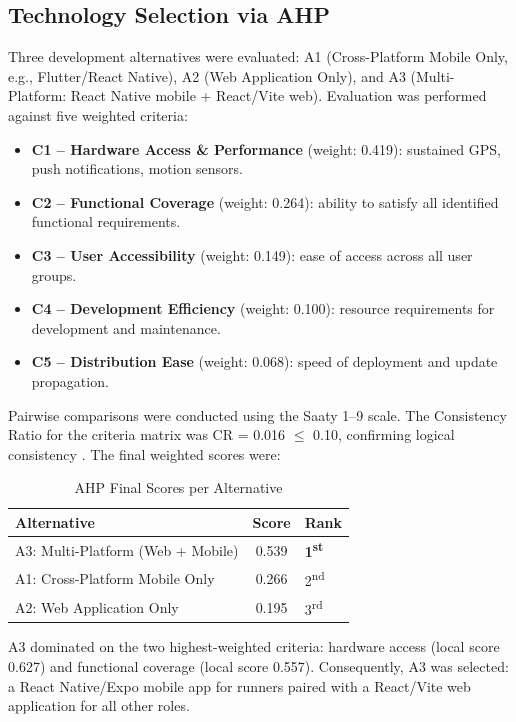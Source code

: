 \documentclass[conference]{IEEEtran}
\begin{document}
\subsection{Technology Selection via AHP}
Three development alternatives were evaluated: A1 (Cross-Platform Mobile Only, e.g., Flutter/React Native), A2 (Web Application Only), and A3 (Multi-Platform: React Native mobile + React/Vite web). Evaluation was performed against five weighted criteria:

\begin{itemize}
    \item \textbf{C1 -- Hardware Access \& Performance} (weight: 0.419): sustained GPS, push notifications, motion sensors.
    \item \textbf{C2 -- Functional Coverage} (weight: 0.264): ability to satisfy all identified functional requirements.
    \item \textbf{C3 -- User Accessibility} (weight: 0.149): ease of access across all user groups.
    \item \textbf{C4 -- Development Efficiency} (weight: 0.100): resource requirements for development and maintenance.
    \item \textbf{C5 -- Distribution Ease} (weight: 0.068): speed of deployment and update propagation.
\end{itemize}

Pairwise comparisons were conducted using the Saaty 1--9 scale. The Consistency Ratio for the criteria matrix was CR = 0.016 $\leq$ 0.10, confirming logical consistency \cite{Saaty1980}. The final weighted scores were:

\begin{table}[htbp]
\centering
\caption{AHP Final Scores per Alternative}
\label{tab:ahp-result}
\begin{tabular}{lcl}
\toprule
\textbf{Alternative} & \textbf{Score} & \textbf{Rank} \\
\midrule
A3: Multi-Platform (Web + Mobile) & 0.539 & \textbf{1\textsuperscript{st}} \\
A1: Cross-Platform Mobile Only    & 0.266 & 2\textsuperscript{nd} \\
A2: Web Application Only          & 0.195 & 3\textsuperscript{rd} \\
\bottomrule
\end{tabular}
\end{table}

A3 dominated on the two highest-weighted criteria: hardware access (local score 0.627) and functional coverage (local score 0.557). Consequently, A3 was selected: a React Native/Expo mobile app for runners paired with a React/Vite web application for all other roles.
\end{document}
